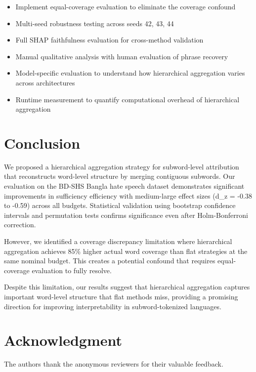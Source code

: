 \documentclass[journal]{IEEEtran}
\begin{document}
\begin{itemize}
    \item Implement equal-coverage evaluation to eliminate the coverage confound
    \item Multi-seed robustness testing across seeds 42, 43, 44
    \item Full SHAP faithfulness evaluation for cross-method validation
    \item Manual qualitative analysis with human evaluation of phrase recovery
    \item Model-specific evaluation to understand how hierarchical aggregation varies across architectures
    \item Runtime measurement to quantify computational overhead of hierarchical aggregation
\end{itemize}

\section{Conclusion}

We proposed a hierarchical aggregation strategy for subword-level attribution that reconstructs word-level structure by merging contiguous subwords. Our evaluation on the BD-SHS Bangla hate speech dataset demonstrates significant improvements in sufficiency efficiency with medium-large effect sizes (d_z = -0.38 to -0.59) across all budgets. Statistical validation using bootstrap confidence intervals and permutation tests confirms significance even after Holm-Bonferroni correction.

However, we identified a coverage discrepancy limitation where hierarchical aggregation achieves 85\% higher actual word coverage than flat strategies at the same nominal budget. This creates a potential confound that requires equal-coverage evaluation to fully resolve.

Despite this limitation, our results suggest that hierarchical aggregation captures important word-level structure that flat methods miss, providing a promising direction for improving interpretability in subword-tokenized languages.

\section*{Acknowledgment}

The authors thank the anonymous reviewers for their valuable feedback.



\end{document}
